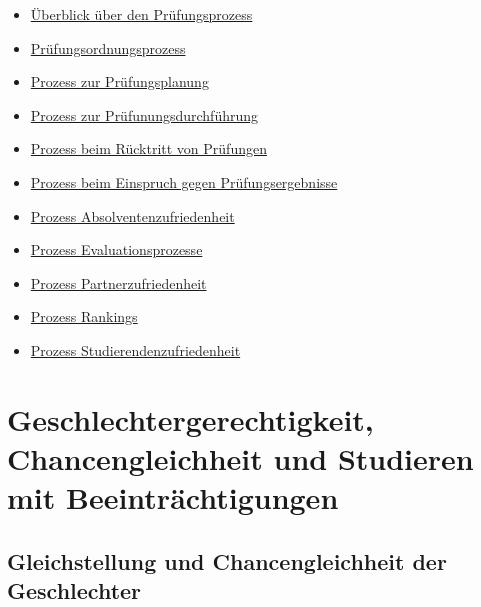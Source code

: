 \begin{itemize}
\tightlist
\item
  \href{https://th-koeln.github.io/mi-2017/anhaenge/Prozessbeschreibung_PruefungsprozessUeberblick.pdf}{Überblick
  über den Prüfungsprozess}
\item
  \href{https://th-koeln.github.io/mi-2017/anhaenge/Prozessbeschreibung_Pruefungsordnungsprozess.pdf}{Prüfungsordnungsprozess}
\item
  \href{https://th-koeln.github.io/mi-2017/anhaenge/Prozessbeschreibung_Pruefungplanung.pdf}{Prozess zur
  Prüfungsplanung}
\item
  \href{https://th-koeln.github.io/mi-2017/anhaenge/Prozessbeschreibung_Pruefungdurchfuehren.pdf}{Prozess
  zur Prüfunungsdurchführung}
\item
  \href{https://th-koeln.github.io/mi-2017/anhaenge/Prozessbeschreibung_vonPruefungzuruecktreten.pdf}{Prozess
  beim Rücktritt von Prüfungen}
\item
  \href{https://th-koeln.github.io/mi-2017/anhaenge/Prozessbeschreibung_EinspruchPruefungsergebnisse.pdf}{Prozess
  beim Einspruch gegen Prüfungsergebnisse}
\item
  \href{https://th-koeln.github.io/mi-2017/anhaenge/Prozessbeschreibung-Absolventenzufriedenheit.pdf}{Prozess
  Absolventenzufriedenheit}
\item
  \href{https://th-koeln.github.io/mi-2017/anhaenge/Prozessbeschreibung-Evaluationsprozesse.pdf}{Prozess
  Evaluationsprozesse}
\item
  \href{https://th-koeln.github.io/mi-2017/anhaenge/Prozessbeschreibung-Partnerzufriedenheit.pdf}{Prozess
  Partnerzufriedenheit}
\item
  \href{https://th-koeln.github.io/mi-2017/anhaenge/Prozessbeschreibung-Rankings.pdf}{Prozess Rankings}
\item
  \href{https://th-koeln.github.io/mi-2017/anhaenge/Prozessbeschreibung-Studierendenzufriedenheit.pdf}{Prozess
  Studierendenzufriedenheit}
\end{itemize}

\chapter{Geschlechtergerechtigkeit, Chancengleichheit und Studieren mit
Beeinträchtigungen}\label{geschlechtergerechtigkeit-chancengleichheit-und-studieren-mit-beeintruxe4chtigungen}

\section{Gleichstellung und Chancengleichheit der
Geschlechter}\label{gleichstellung-und-chancengleichheit-der-geschlechter}

